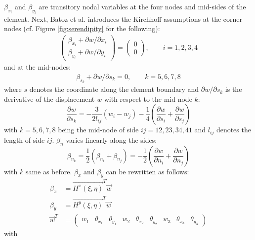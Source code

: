   $\beta_{x_i}$ and $\beta_{y_i}$ are transitory nodal variables at the four nodes and mid-sides of the element.
  Next, Batoz et al. introduces the Kirchhoff assumptions at the corner nodes (cf. Figure \ref{fig:serendipity} for the following):
  \begin{align}
  \begin{pmatrix}
  \beta_{x_i} + \partial w/\partial x_i \\
  \beta_{y_i} + \partial w/\partial y_i
  \end{pmatrix} = \begin{pmatrix}
  0\\0
  \end{pmatrix},\qquad i = 1,2,3,4
  \end{align}
  and at the mid-nodes:
  \begin{align}
  \beta_{s_k} + \partial w/\partial s_k = 0,\qquad k = 5,6,7,8
  \end{align}
  where $s$ denotes the coordinate along the element boundary and $\partial w/\partial s_k$ is the derivative of the displacement $w$ with respect to the mid-node $k$:
  \begin{equation}
  \frac{\partial w}{\partial s_k} = -\frac{3}{2 l_{ij}}(w_i-w_j) - \frac{1}{4}\left(\frac{\partial w}{\partial s_i} + \frac{\partial w}{\partial s_j}\right)
  \end{equation}
  with $k = 5,6,7,8$ being the mid-node of side $ij = 12, 23, 34, 41$ and $l_{ij}$ denotes the length of side $ij$.
  $\beta_n$ varies linearly along the sides:
  \begin{equation}
  \beta_{n_k} = \frac{1}{2}\left(\beta_{n_i} + \beta_{n_j}\right) = -\frac{1}{2} \left(\frac{\partial w}{\partial n_i} + \frac{\partial w}{\partial n_j}\right)
  \end{equation}
  with $k$ same as before.
  $\beta_x$ and $\beta_y$ can be rewritten as follows:
  \begin{align}
  \beta_x &= \vec{H^x(\xi,\eta)}^T \vec{w}\\
  \beta_y &= \vec{H^y(\xi,\eta)}^T \vec{w}\\
  \vec{w}^T &= \begin{pmatrix}
  w_1&\theta_{x_1}&\theta_{y_1}&w_2&\theta_{x_2}&\theta_{y_2}&w_3&\theta_{x_3}&\theta_{y_3}
  \end{pmatrix} \nonumber
  \end{align}
  with
